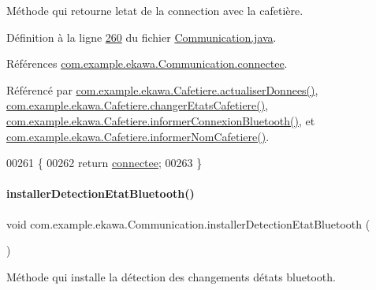 Méthode qui retourne l\textquotesingle{}etat de la connection avec la cafetière. 



Définition à la ligne \hyperlink{_communication_8java_source_l00260}{260} du fichier \hyperlink{_communication_8java_source}{Communication.\+java}.



Références \hyperlink{_communication_8java_source_l00043}{com.\+example.\+ekawa.\+Communication.\+connectee}.



Référencé par \hyperlink{_cafetiere_8java_source_l00495}{com.\+example.\+ekawa.\+Cafetiere.\+actualiser\+Donnees()}, \hyperlink{_cafetiere_8java_source_l00636}{com.\+example.\+ekawa.\+Cafetiere.\+changer\+Etats\+Cafetiere()}, \hyperlink{_cafetiere_8java_source_l00275}{com.\+example.\+ekawa.\+Cafetiere.\+informer\+Connexion\+Bluetooth()}, et \hyperlink{_cafetiere_8java_source_l00336}{com.\+example.\+ekawa.\+Cafetiere.\+informer\+Nom\+Cafetiere()}.


\begin{DoxyCode}
00261     \{
00262         \textcolor{keywordflow}{return} \hyperlink{classcom_1_1example_1_1ekawa_1_1_communication_a93d9caaa9d4454a32d9dc28a6f22d2eb}{connectee};
00263     \}
\end{DoxyCode}
\mbox{\label{classcom_1_1example_1_1ekawa_1_1_communication_a6640c878b7a4c97af7ccda45e33ead80}} 
\paragraph{\texorpdfstring{installer\+Detection\+Etat\+Bluetooth()}{installerDetectionEtatBluetooth()}}
{\footnotesize\ttfamily void com.\+example.\+ekawa.\+Communication.\+installer\+Detection\+Etat\+Bluetooth (\begin{DoxyParamCaption}{ }\end{DoxyParamCaption})\hspace{0.3cm}{\ttfamily [private]}}



Méthode qui installe la détection des changements d\textquotesingle{}états bluetooth. 



